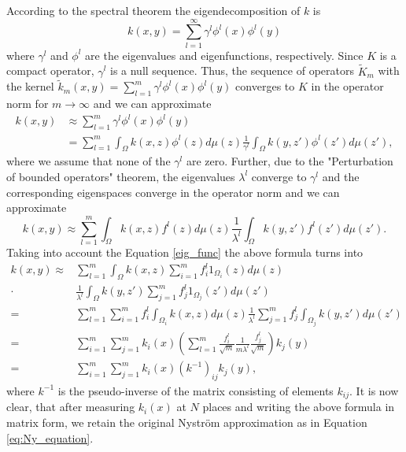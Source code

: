 \documentclass[twoside,11pt]{article}
\begin{document}
\noindent According to the spectral theorem \cite{werner}
the eigendecomposition of $k$ is
\[
k(x,y) = \sum_{l=1}^\infty \gamma^l \phi^l(x) \phi^l(y)
\]
where $\gamma^l$ and $\phi^l$ are the eigenvalues and eigenfunctions, respectively.
Since $K$ is a compact operator, $\gamma^l$ is a null sequence.
Thus, the sequence of operators $\tilde{K}_m$ with the kernel
$\tilde{k}_m(x,y) = \sum_{l=1}^m \gamma^l \phi^l(x) \phi^l(y)$
converges to $K$ in the operator norm for $m \to \infty$ \cite{werner}
and we can approximate
\begin{align*}
k(x,y) & \approx
 \sum_{l=1}^m \gamma^l \phi^l(x) \phi^l(y) \\
& = \sum_{l=1}^m 
 \int_{\Omega} k(x,z) \phi^l(z) d\mu(z)
 \frac{1}{\gamma^l}
 \int_{\Omega} k(y,z') \phi^l(z') d\mu(z'),
\end{align*}
where we assume that none of the $\gamma^l$ are zero.
Further, due to the "Perturbation of bounded operators" theorem,
the eigenvalues $\lambda^l$ converge to $\gamma^l$
and the corresponding eigenspaces converge in the operator norm
and we can approximate
\[
k(x,y) \approx \sum_{l=1}^m 
 \int_{\Omega} k(x,z) f^l(z) d\mu(z)
 \frac{1}{\lambda^l}
 \int_{\Omega} k(y,z') f^l(z') d\mu(z').
\]
Taking into account the Equation \eqref{eig_func} the above formula turns into
\begin{align*}
k(x,y) \approx & \sum_{l=1}^m 
 \int_{\Omega} k(x,z) \sum_{i=1}^m f^l_i 1_{\Omega_i}(z) d\mu(z)\\
\cdot \; &
 \frac{1}{\lambda^l}
 \int_{\Omega} k(y,z') \sum_{j=1}^m f^l_j 1_{\Omega_j}(z') d\mu(z') \\
 = & \sum_{l=1}^m 
 \sum_{i=1}^m f^l_i \int_{\Omega_i} k(x,z) d\mu(z)
 \frac{1}{\lambda^l}
 \sum_{j=1}^m f^l_j \int_{\Omega_j} k(y,z') d\mu(z') \\
 = & \sum_{i=1}^m \sum_{j=1}^m
 k_i(x)
\left( 
 \sum_{l=1}^m \frac{f^l_i}{\sqrt{m}}  \frac{1}{m \lambda^l} \frac{f^l_j}{\sqrt{m}}
\right)
 k_j(y)\\
 = & \sum_{i=1}^m \sum_{j=1}^m
 k_i(x)
 \left( k^{-1} \right)_{ij}
 k_j(y),
\end{align*}
where $k^{-1}$ is the pseudo-inverse of the matrix consisting of elements $k_{ij}$.
It is now clear, that after measuring $k_i(x)$ at $N$ places
and writing the above formula in matrix form,
we retain the original Nystr\"om approximation as in Equation \eqref{eq:Ny_equation}.
\end{document}
